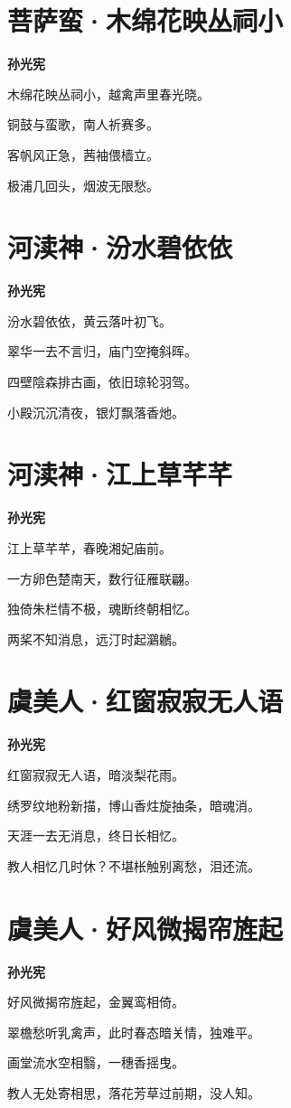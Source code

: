 \documentclass[12pt,a4paper]{ctexbook}
\begin{document}
\section{菩萨蛮·木绵花映丛祠小}
\textbf{孙光宪}\par\vspace{0.5em}
木绵花映丛祠小，越禽声里春光晓。\par
铜鼓与蛮歌，南人祈赛多。\par
客帆风正急，茜袖偎樯立。\par
极浦几回头，烟波无限愁。\par

\section{河渎神·汾水碧依依}
\textbf{孙光宪}\par\vspace{0.5em}
汾水碧依依，黄云落叶初飞。\par
翠华一去不言归，庙门空掩斜晖。\par
四壁陰森排古画，依旧琼轮羽驾。\par
小殿沉沉清夜，银灯飘落香灺。\par

\section{河渎神·江上草芊芊}
\textbf{孙光宪}\par\vspace{0.5em}
江上草芊芊，春晚湘妃庙前。\par
一方卵色楚南天，数行征雁联翩。\par
独倚朱栏情不极，魂断终朝相忆。\par
两桨不知消息，远汀时起鸂鶒。\par

\section{虞美人·红窗寂寂无人语}
\textbf{孙光宪}\par\vspace{0.5em}
红窗寂寂无人语，暗淡梨花雨。\par
绣罗纹地粉新描，博山香炷旋抽条，暗魂消。\par
天涯一去无消息，终日长相忆。\par
教人相忆几时休？不堪枨触别离愁，泪还流。\par

\section{虞美人·好风微揭帘旌起}
\textbf{孙光宪}\par\vspace{0.5em}
好风微揭帘旌起，金翼鸾相倚。\par
翠檐愁听乳禽声，此时春态暗关情，独难平。\par
画堂流水空相翳，一穗香摇曳。\par
教人无处寄相思，落花芳草过前期，没人知。\par
\end{document}
